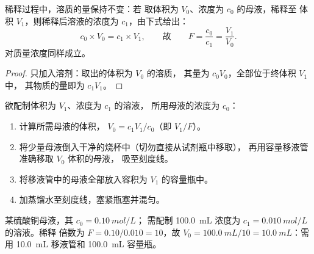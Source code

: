 \begin{proposition}[溶质的量保持不变]\label{prop:g10:concentration-and-dilution:kept}
稀释过程中，溶质的量保持不变：若
取体积为 $V_0$、浓度为 $c_0$ 的母液，稀释至
体积 $V_1$，则稀释后溶液的浓度为 $c_1$，由下式给出：
\[
  c_0 \times V_0 = c_1 \times V_1,
  \qquad\text{故}\qquad
  F = \frac{c_0}{c_1} = \frac{V_1}{V_0} .
\]
对质量浓度同样成立。
\end{proposition}

\begin{proof}
只加入溶剂：取出的体积为 $V_0$ 的溶质，
其量为 $c_0 V_0$，全部位于终体积 $V_1$ 中，
其物质的量即为 $c_1 V_1$。
\end{proof}


\begin{method}[用稀释法配制溶液]\label{met:g10:concentration-and-dilution:diluting}
欲配制体积为 $V_1$、浓度为 $c_1$ 的溶液，
所用母液的浓度为 $c_0$：
\begin{enumerate}
  \item 计算所需母液的体积，
        $V_0 = c_1 V_1 / c_0$（即 $V_1 / F$）。
  \item 将少量母液倒入干净的烧杯中（切勿直接从试剂瓶中移取），
        再用容量移液管准确移取 $V_0$ 体积的母液，
        吸至刻度线。
  \item 将移液管中的母液全部放入容积为 $V_1$ 的容量瓶中。
  \item 加蒸馏水至刻度线，塞紧瓶塞并混匀。
\end{enumerate}
\end{method}

\begin{example}[一次十倍稀释]\label{ex:g10:concentration-and-dilution:tenfold}
某硫酸铜母液，其 $c_0 = \qty{0.10}{mol/L}$；
需配制 \qty{100.0}{mL} 浓度为 $c_1 = \qty{0.010}{mol/L}$ 的溶液。稀释
倍数为 $F = 0.10 / 0.010 = 10$，故 $V_0 = \qty{100.0}{mL} / 10 =
\qty{10.0}{mL}$：需用 \qty{10.0}{mL} 移液管和 \qty{100.0}{mL} 容量瓶。
\end{example}

